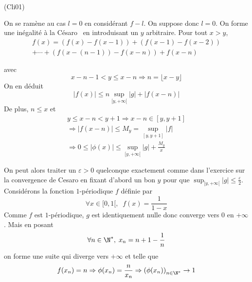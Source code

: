 \begin{tiny}(Cli01)\end{tiny} On se ramène au cas $l=0$ en considérant $f-l$. On suppose donc $l=0$.\newline
On forme une inégalité \og à la Césaro\fg~ en introduisant un $y$ arbitraire. Pour tout $x >y$,
\begin{multline*}
f(x) = 
\left( f(x)-f(x-1)\right) 
+ \left( f(x-1)-f(x-2)\right)\\
+ \cdots 
+ \left( f(x-(n-1))-f(x-n)\right)
+ f(x-n)
\end{multline*}

avec 
\begin{displaymath}
  x-n-1< y \leq x - n \Rightarrow n = \lfloor x-y \rfloor
\end{displaymath}
On en déduit
\begin{displaymath}
|f(x)|\leq  n\sup_{[y,+\infty[}|g| + |f(x-n)|  
\end{displaymath}
De plus, $n\leq x$ et 
\begin{multline*}
  y \leq x-n < y+1 \Rightarrow x - n \in [y,y+1] \\
  \Rightarrow |f(x-n)|\leq M_y = \sup_{[y,y+1]}|f| \\
  \Rightarrow 0 \leq |\phi(x)| \leq \sup_{[y,+\infty[}|g| + \frac{M_y}{x}
\end{multline*}

On peut alors traiter un $\varepsilon>0$ quelconque exactement comme dans l'exercice sur la convergence de Cesaro en fixant d'abord un bon $y$ pour que $\sup_{[y,+\infty[}|g|\leq \frac{\varepsilon}{2}$.\newline
Considérons la fonction $1$-périodique $f$ définie par
\begin{displaymath}
  \forall x\in [0,1[,\; \;f(x) = \frac{1}{1-x}
\end{displaymath}
Comme $f$ est $1$-périodique, $g$ est identiquement nulle donc converge vers $0$ en $+\infty$. Mais en posant 
\begin{displaymath}
\forall n\in \N^*,\; x_n = n + 1 - \frac{1}{n}  
\end{displaymath}
on forme une suite qui diverge vers $+\infty$ et telle que 
\begin{displaymath}
  f(x_n) = n \Rightarrow \phi(x_n) = \frac{n}{x_n}\Rightarrow \left( \phi(x_n)\right)_{n\in \N^*} \rightarrow 1
\end{displaymath}

